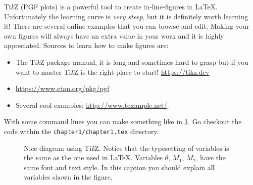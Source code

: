 Ti\textit{k}Z  (PGF plots) is a powerful tool to create in-line-figures in \LaTeX. Unfortunately the learning curve is \textit{very steep}, but it is definitely worth learning it! There are several online examples that you can browse and edit. Making your own figures will always have an extra value in your work and it is highly appreciated. Sources to learn how to make figures are:
\begin{itemize}
    \item The Ti\textit{k}Z package manual, it is long and sometimes hard to grasp but if you want to master Ti\textit{k}Z is the right place to start! \url{https://tikz.dev}
    \item \url{https://www.ctan.org/pkg/pgf}
    \item Several cool examples: \url{http://www.texample.net/}.
\end{itemize}
With some command lines you can make something like in \cref{fig:my_tikz_fig}. Go checkout the code within the \texttt{chapter1/chapter1.tex} directory.

\begin{figure}[t]
  \centering
  \caption[My first Ti\textit{k}Z figure]{Nice diagram using Ti\textit{k}Z. Notice that the typesetting of variables is the same as the one used in \LaTeX. Variables $\theta$, $M_1$, $M_2$, have the same font and text style. In this caption you should explain all variables shown in the figure.}
  \label{fig:my_tikz_fig}
\end{figure}



